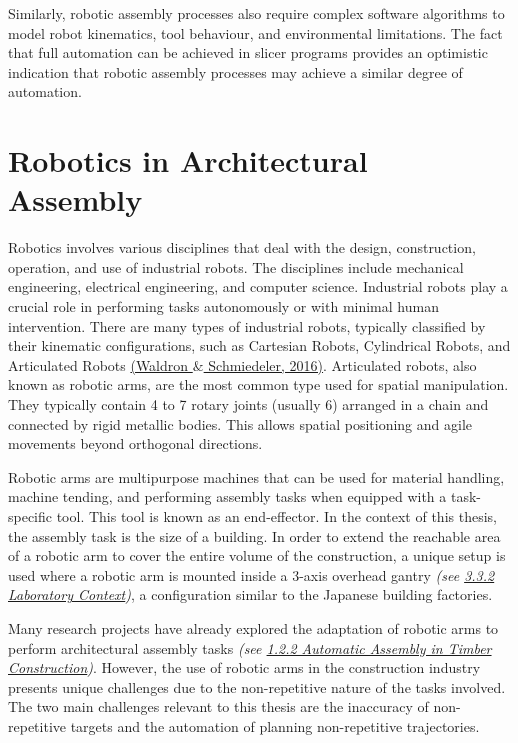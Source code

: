\documentclass[11pt]{book}
\begin{document}
Similarly, robotic assembly processes also require complex software algorithms to model robot kinematics, tool behaviour, and environmental limitations. The fact that full automation can be achieved in slicer programs provides an optimistic indication that robotic assembly processes may achieve a similar degree of automation.

\section{Robotics in Architectural Assembly}

Robotics involves various disciplines that deal with the design, construction, operation, and use of industrial robots. The disciplines include mechanical engineering, electrical engineering, and computer science. Industrial robots play a crucial role in performing tasks autonomously or with minimal human intervention. There are many types of industrial robots, typically classified by their kinematic configurations, such as Cartesian Robots, Cylindrical Robots, and Articulated Robots \href{https://www.zotero.org/google-docs/?GleUjw}{(Waldron $\&$ Schmiedeler, 2016)}. Articulated robots, also known as robotic arms, are the most common type used for spatial manipulation. They typically contain 4 to 7 rotary joints (usually 6) arranged in a chain and connected by rigid metallic bodies. This allows spatial positioning and agile movements beyond orthogonal directions.

Robotic arms are multipurpose machines that can be used for material handling, machine tending, and performing assembly tasks when equipped with a task-specific tool. This tool is known as an end-effector. In the context of this thesis, the assembly task is the size of a building. In order to extend the reachable area of a robotic arm to cover the entire volume of the construction, a unique setup is used where a robotic arm is mounted inside a 3-axis overhead gantry\textit{ (see \underline{3.3.2 Laboratory Context})}, a configuration similar to the Japanese building factories.

Many research projects have already explored the adaptation of robotic arms to perform architectural assembly tasks \textit{(see \underline{1.2.2 Automatic Assembly in Timber Construction})}. However, the use of robotic arms in the construction industry presents unique challenges due to the non-repetitive nature of the tasks involved. The two main challenges relevant to this thesis are the inaccuracy of non-repetitive targets and the automation of planning non-repetitive trajectories.
\end{document}

